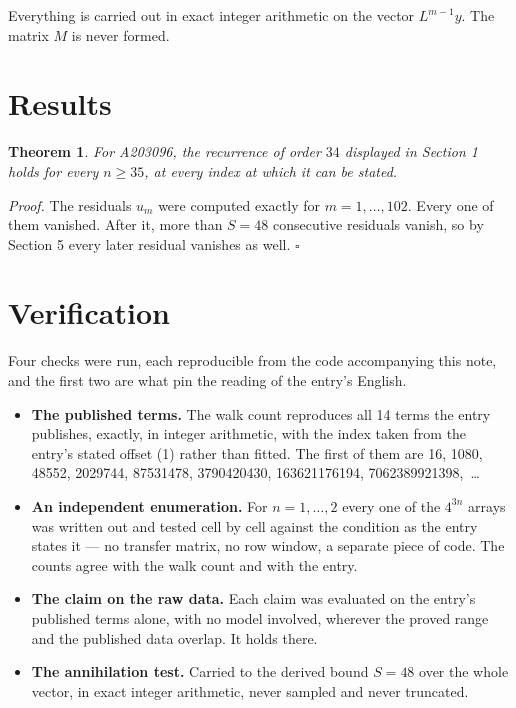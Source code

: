\documentclass[11pt]{article}
\newtheorem{theorem}{Theorem}
\theoremstyle{definition}
\begin{document}
Everything is carried out in exact integer arithmetic on the vector $L^{m-1}y$. The matrix $M$ is never formed.

\section{Results}

\begin{theorem} For A203096, the recurrence of order $34$ displayed in Section 1 holds for every $n \ge 35$, at every index at which it can be stated.\end{theorem}

{\itshape Proof.} The residuals $u_m$ were computed exactly for $m = 1,\dots,102$. Every one of them vanished. After it, more than $S = 48$ consecutive residuals vanish, so by Section 5 every later residual vanishes as well. $\square$

\section{Verification}

Four checks were run, each reproducible from the code accompanying this note, and the first two are what pin the reading of the entry's English.

\begin{itemize}

\item {\bfseries The published terms.} The walk count reproduces all 14 terms the entry publishes, exactly, in integer arithmetic, with the index taken from the entry's stated offset (1) rather than fitted. The first of them are 16, 1080, 48552, 2029744, 87531478, 3790420430, 163621176194, 7062389921398,~\dots

\item {\bfseries An independent enumeration.} For $n = 1,\dots,2$ every one of the $4^{3n}$ arrays was written out and tested cell by cell against the condition as the entry states it --- no transfer matrix, no row window, a separate piece of code. The counts agree with the walk count and with the entry.

\item {\bfseries The claim on the raw data.} Each claim was evaluated on the entry's published terms alone, with no model involved, wherever the proved range and the published data overlap. It holds there.

\item {\bfseries The annihilation test.} Carried to the derived bound $S = 48$ over the whole vector, in exact integer arithmetic, never sampled and never truncated.

\end{itemize}
\end{document}
